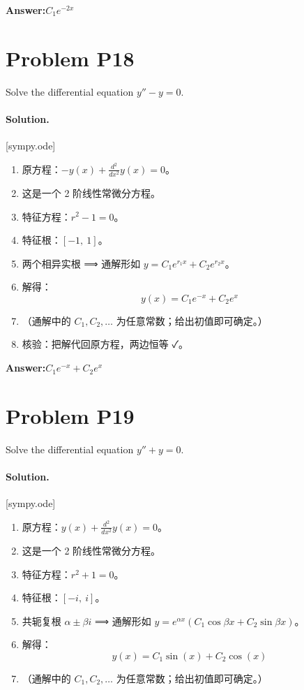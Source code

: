 \documentclass[11pt,a4paper]{ctexart}
\newcommand{\solvertag}[1]{{\footnotesize\color{gray}\textsf{[#1]}}}
\begin{document}
\noindent\textbf{Answer:}\quad $C_{1} e^{- 2 x}$

\medskip

\section*{Problem P18}
Solve the differential equation $y'' - y = 0$.

\paragraph{Solution.} \solvertag{sympy.ode} 

\begin{enumerate}[leftmargin=*]
  \item 原方程：$- y{\left(x \right)} + \frac{d^{2}}{d x^{2}} y{\left(x \right)} = 0$。
  \item 这是一个 2 阶线性常微分方程。
  \item 特征方程：$r^{2} - 1 = 0$。
  \item 特征根：$\left[ -1, \  1\right]$。
  \item 两个相异实根 ⟹ 通解形如 $y = C_1 e^{r_1 x} + C_2 e^{r_2 x}$。
  \item 解得：$$y{\left(x \right)} = C_{1} e^{- x} + C_{2} e^{x}$$
  \item （通解中的 $C_1, C_2, \dots$ 为任意常数；给出初值即可确定。）
  \item 核验：把解代回原方程，两边恒等 ✓。
\end{enumerate}

\noindent\textbf{Answer:}\quad $C_{1} e^{- x} + C_{2} e^{x}$

\medskip

\section*{Problem P19}
Solve the differential equation $y'' + y = 0$.

\paragraph{Solution.} \solvertag{sympy.ode} 

\begin{enumerate}[leftmargin=*]
  \item 原方程：$y{\left(x \right)} + \frac{d^{2}}{d x^{2}} y{\left(x \right)} = 0$。
  \item 这是一个 2 阶线性常微分方程。
  \item 特征方程：$r^{2} + 1 = 0$。
  \item 特征根：$\left[ - i, \  i\right]$。
  \item 共轭复根 $\alpha \pm \beta i$ ⟹ 通解形如 $y = e^{\alpha x}(C_1\cos\beta x + C_2\sin\beta x)$。
  \item 解得：$$y{\left(x \right)} = C_{1} \sin{\left(x \right)} + C_{2} \cos{\left(x \right)}$$
  \item （通解中的 $C_1, C_2, \dots$ 为任意常数；给出初值即可确定。）
\end{enumerate}
\end{document}
